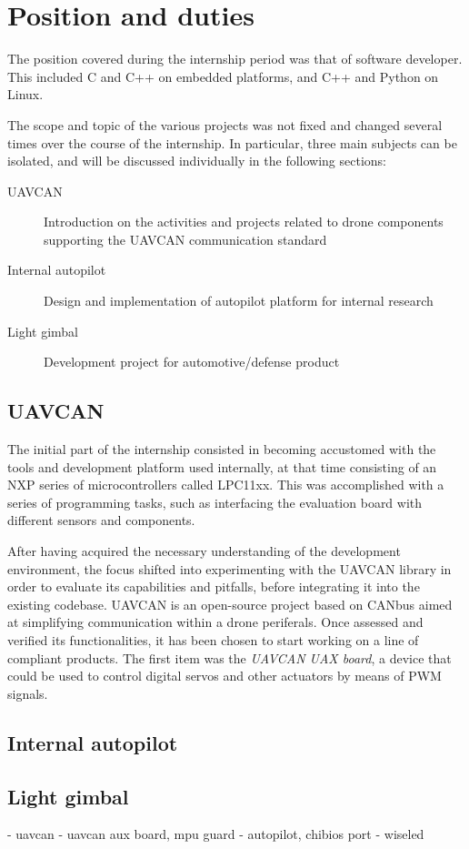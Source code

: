 \section{Position and duties}
The position covered during the internship period was that of software developer.
This included C and C++ on embedded platforms, and C++ and Python on Linux.

The scope and topic of the various projects was not fixed and changed several times over the course of the internship. 
In particular, three main subjects can be isolated, and will be discussed individually in the following sections:

\begin{description}  
\item [UAVCAN] Introduction on the activities and projects related to drone components supporting the UAVCAN communication standard
\item [Internal autopilot] Design and implementation of autopilot platform for internal research  
\item [Light gimbal] Development project for automotive/defense product 
\end{description}


\subsection{UAVCAN}
The initial part of the internship consisted in becoming accustomed with the tools and development platform used internally, at that time consisting of an NXP series of microcontrollers called LPC11xx.
This was accomplished with a series of programming tasks, such as interfacing the evaluation board with different sensors and components.

After having acquired the necessary understanding of the development environment, the focus shifted into experimenting with the UAVCAN library in order to evaluate its capabilities and pitfalls, before integrating it into the existing codebase.
UAVCAN is an open-source project based on CANbus aimed at simplifying communication within a drone periferals.
Once assessed and verified its functionalities, it has been chosen to start working on a line of compliant products.
The first item was the \emph{UAVCAN UAX board}, a device that could be used to control digital servos and other actuators by means of PWM signals.


\subsection{Internal autopilot}



\subsection{Light gimbal}




- uavcan
- uavcan aux board, mpu guard
- autopilot, chibios port
- wiseled